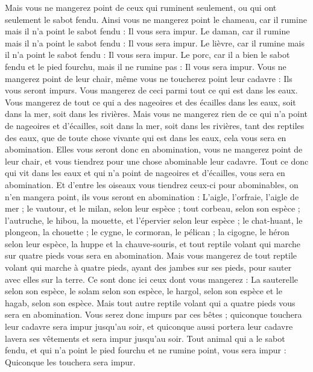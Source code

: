 \begin{multicols}{2}
Mais vous ne mangerez point de ceux qui ruminent seulement, ou qui ont seulement le sabot fendu. Ainsi vous ne mangerez point le chameau, car il rumine mais il n'a point le sabot fendu : Il vous sera impur.
Le daman, car il rumine mais il n'a point le sabot fendu : Il vous sera impur.
Le lièvre, car il rumine mais il n'a point le sabot fendu : Il vous sera impur.
Le porc, car il a bien le sabot fendu et le pied fourchu, mais il ne rumine pas : Il vous sera impur.
Vous ne mangerez point de leur chair, même vous ne toucherez point leur cadavre : Ils vous seront impurs.
Vous mangerez de ceci parmi tout ce qui est dans les eaux. Vous mangerez de tout ce qui a des nageoires et des écailles dans les eaux, soit dans la mer, soit dans les rivières.
Mais vous ne mangerez rien de ce qui n'a point de nageoires et d'écailles, soit dans la mer, soit dans les rivières, tant des reptiles des eaux, que de toute chose vivante qui est dans les eaux, cela vous sera en abomination.
Elles vous seront donc en abomination, vous ne mangerez point de leur chair, et vous tiendrez pour une chose abominable leur cadavre.
Tout ce donc qui vit dans les eaux et qui n'a point de nageoires et d'écailles, vous sera en abomination.
Et d'entre les oiseaux vous tiendrez ceux-ci pour abominables, on n'en mangera point, ils vous seront en abomination : L'aigle, l'orfraie, l’aigle de mer ;
le vautour, et le milan, selon leur espèce ;
tout corbeau, selon son espèce ;
l’autruche, le hibou, la mouette, et l'épervier selon leur espèce ;
le chat-huant, le plongeon, la chouette ;
le cygne, le cormoran, le pélican ;
la cigogne, le héron selon leur espèce, la huppe et la chauve-souris,
et tout reptile volant qui marche sur quatre pieds vous sera en abomination.
Mais vous mangerez de tout reptile volant qui marche à quatre pieds, ayant des jambes sur ses pieds, pour sauter avec elles sur la terre.
Ce sont donc ici ceux dont vous mangerez : La sauterelle selon son espèce, le solam selon son espèce, le hargol, selon son espèce et le hagab, selon son espèce.
Mais tout autre reptile volant qui a quatre pieds vous sera en abomination.
Vous serez donc impurs par ces bêtes ; quiconque touchera leur cadavre sera impur jusqu'au soir,
et quiconque aussi portera leur cadavre lavera ses vêtements et sera impur jusqu'au soir.
Tout animal qui a le sabot fendu, et qui n'a point le pied fourchu et ne rumine point, vous sera impur : Quiconque les touchera sera impur.

\end{multicols}
